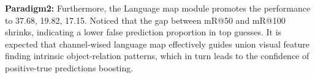 \documentclass[runningheads]{llncs}
\begin{document}
\noindent\textbf{Paradigm2:} Furthermore, the Language map module promotes the
performance to 37.68, 19.82, 17.15. Noticed that the gap between mR@50 and
mR@100 shrinks, indicating a lower false prediction proportion in top guesses.
It is expected that channel-wised language map effectively guides union visual
feature finding intrinsic object-relation patterns, which in turn leads to the
confidence of positive-true predictions boosting.\\
\begin{table}[t]
  \centering
  \caption{Ablation studies on framework structure}
  \label{tab:ab1}
\end{table}
\end{document}
